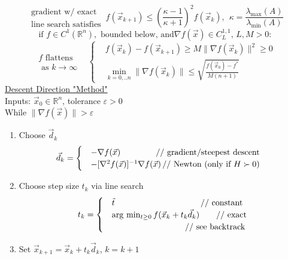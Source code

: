 \documentclass[twocolumn,12pt]{article}    %
\begin{document}
\begin{equation*}
    \begin{matrix}
        \text{gradient w/ exact}\\
        \text{line search satisfies}
    \end{matrix} \, f(\vec{x}_{k+1}) \leq \left(\frac{\kappa -1}{\kappa+1}\right)^2 f(\vec{x}_k),\hspace{5pt}
    \kappa = \frac{\lambda_{\max}(A)}{\lambda_{\min}(A)}
\end{equation*}
\begin{equation*}
    \text{if } f\in C^1(\mathds{R}^n), \text{ bounded below, and} \nabla f(\vec{x}) \in C_L^{1,1},\, L,M>0:
\end{equation*}
\begin{equation*}\begin{matrix}
    f \text{ flattens}\\ \text{ as }k\to\infty \hspace{10pt}
\end{matrix}
    \begin{cases}
    & f(\vec{x}_k) - f(\vec{x}_{k+1}) \geq M\| \nabla f(\vec{x}_k) \|^2 \geq 0 \\
    & \min_{k=0,..n} \| \nabla f(\vec{x}_k) \| \leq \sqrt{\frac{f(\vec{x}_0) - f^*}{M(n+1)}}
\end{cases}
\end{equation*}
\noindent\underline{Descent Direction "Method"}\\
Inputs: \(\vec{x}_0 \in \mathds{R}^n\), tolerance \(\varepsilon >0\)\\
While \(\|\nabla f(\vec{x})\| > \varepsilon\)
\begin{enumerate}
    \item Choose \(\vec{d}_k\)
    \begin{equation*}
    \hspace{-10pt} \vec{d}_k =\begin{cases}
        & - \nabla f(\vec{x}) \hspace{42.5pt} \text{// gradient/steepest descent}\\
        & -[\nabla^2 f(\vec{x})]^{-1} \nabla f(\vec{x}) \,\text{// Newton (only if }H\succ 0)
    \end{cases}
    \end{equation*}

    \item Choose step size \(t_k\) via line search
    \begin{equation*}
        t_k = \begin{cases}
            &\tilde{t} \hspace{102.5pt} \text{// constant}\\
            &\arg\, \min_{t\geq0} f(\vec{x}_k + t_k\vec{d}_k) 
            \hspace{20pt} \text{// exact}\\
            & \hspace{87.5pt}\text{// see backtrack}
        \end{cases}
    \end{equation*}

    \item Set \(\vec{x}_{k+1} = \vec{x}_k + t_k \vec{d}_k\), \(k=k+1\)
\end{enumerate}
\end{document}

